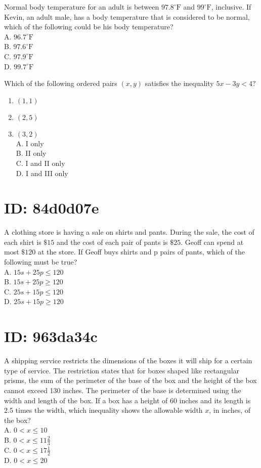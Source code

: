 Normal body temperature for an adult is between $97.8^{\circ} \mathrm{F}$ and $99^{\circ} \mathrm{F}$, inclusive. If\\
Kevin, an adult male, has a body temperature that is considered to be normal, which of the following could be his body temperature?\\
A. $96.7^{\circ} \mathrm{F}$\\
B. $97.6^{\circ} \mathrm{F}$\\
C. $97.9^{\circ} \mathrm{F}$\\
D. $99.7^{\circ} \mathrm{F}$

Which of the following ordered pairs $(x, y)$ satisfies the inequality $5 x-3 y<4 ?$

\begin{enumerate}
  \item $(1,1)$
  \item $(2,5)$
  \item $(3,2)$\\
A. I only\\
B. II only\\
C. I and II only\\
D. I and III only
\end{enumerate}

\section*{ID: 84d0d07e}
A clothing store is having a sale on shirts and pants. During the sale, the cost of each shirt is $\$ 15$ and the cost of each pair of pants is $\$ 25$. Geoff can spend at most $\$ 120$ at the store. If Geoff buys shirts and p pairs of pants, which of the following must be true?\\
A. $15 s+25 p \leq 120$\\
B. $15 s+25 p \geq 120$\\
C. $25 s+15 p \leq 120$\\
D. $25 s+15 p \geq 120$

\section*{ID: 963da34c}
A shipping service restricts the dimensions of the boxes it will ship for a certain type of service. The restriction states that for boxes shaped like rectangular prisms, the sum of the perimeter of the base of the box and the height of the box cannot exceed 130 inches. The perimeter of the base is determined using the width and length of the box. If a box has a height of 60 inches and its length is 2.5 times the width, which inequality shows the allowable width $x$, in inches, of the box?\\
A. $0<x \leq 10$\\
B. $0<x \leq 11 \frac{2}{3}$\\
C. $0<x \leq 17 \frac{1}{2}$\\
D. $0<x \leq 20$

